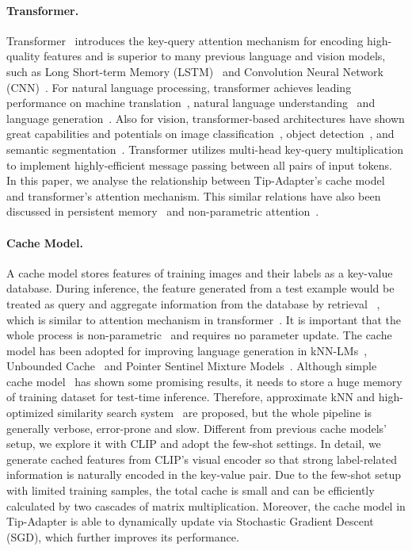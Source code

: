 \documentclass[10pt,twocolumn,letterpaper]{article}
\begin{document}
\paragraph{Transformer.}

Transformer~\cite{vaswani2017attention} introduces the key-query attention mechanism for encoding high-quality features and is superior to many previous language and vision models, such as Long Short-term Memory (LSTM)~\cite{hochreiter1997long} and Convolution Neural Network (CNN)~\cite{lecun1998gradient}. For natural language processing, transformer achieves leading performance on machine translation~\cite{vaswani2017attention,ott2018scaling}, natural language understanding~\cite{devlin2018bert} and language generation~\cite{radford2018improving,brown2020language}. Also for vision, transformer-based architectures have shown great capabilities and potentials on image classification~\cite{dosovitskiy2020image}, object detection~\cite{carion2020end}, and semantic segmentation~\cite{zheng2021rethinking}. Transformer utilizes multi-head key-query multiplication to implement highly-efficient message passing between all pairs of input tokens. In this paper, we analyse the relationship between Tip-Adapter's cache model and transformer's attention mechanism. 
This similar relations have also been discussed in persistent memory~\cite{sukhbaatar2019augmenting} and non-parametric attention~\cite{kossen2021self}.

\paragraph{Cache Model.}
A cache model stores features of training images and their labels as a key-value database. During inference, the feature generated from a test example would be treated as query and aggregate information from the database by retrieval ~\cite{vaswani2017attention}, which is similar to attention mechanism in transformer~\cite{vaswani2017attention}. It is important that the whole process is non-parametric~\cite{kossen2021self} and requires no parameter update. The cache model has been adopted for improving language generation in kNN-LMs~\cite{khandelwal2019generalization}, Unbounded Cache~\cite{grave2017unbounded} and Pointer Sentinel Mixture Models~\cite{merity2016pointer}. Although simple cache model~\cite{orhan2018simple} has shown some promising results, it needs to store a huge memory of training dataset for test-time inference. Therefore, approximate kNN and high-optimized similarity search system~\cite{johnson2019billion} are proposed, but the whole pipeline is generally verbose, error-prone and slow. Different from previous cache models' setup, we explore it with CLIP and adopt the few-shot settings. In detail, we generate cached features from CLIP's visual encoder so that strong label-related information is naturally encoded in the key-value pair. Due to the few-shot setup with limited training samples, the total cache is small and can be efficiently calculated by two cascades of matrix multiplication. Moreover, the cache model in Tip-Adapter is able to dynamically update via Stochastic Gradient Descent (SGD), which further improves its performance.
\end{document}
